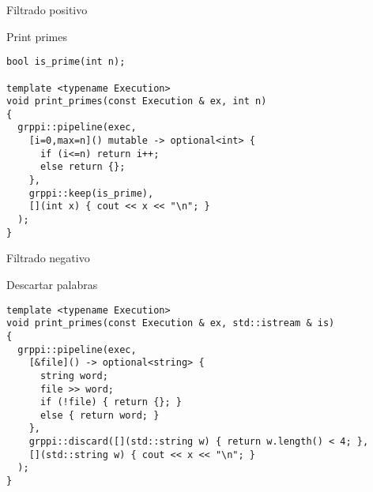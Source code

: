 \begin{frame}[t,fragile]{Filtrado positivo}
\begin{block}{Print primes}
\begin{lstlisting}
bool is_prime(int n);

template <typename Execution>
void print_primes(const Execution & ex, int n)
{
  grppi::pipeline(exec,
    [i=0,max=n]() mutable -> optional<int> {
      if (i<=n) return i++;
      else return {};
    },
    grppi::keep(is_prime),
    [](int x) { cout << x << "\n"; }
  );
}
\end{lstlisting}
\end{block}
\end{frame}

\begin{frame}[t,fragile]{Filtrado negativo}
\begin{block}{Descartar palabras}
\begin{lstlisting}
template <typename Execution>
void print_primes(const Execution & ex, std::istream & is)
{
  grppi::pipeline(exec,
    [&file]() -> optional<string> {
      string word;
      file >> word;
      if (!file) { return {}; }
      else { return word; }
    },
    grppi::discard([](std::string w) { return w.length() < 4; },
    [](std::string w) { cout << x << "\n"; }
  );
}
\end{lstlisting}
\end{block}
\end{frame}

